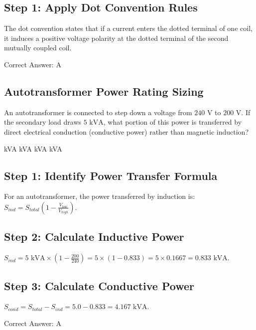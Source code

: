 \begin{solution}

\subsection*{Step 1: Apply Dot Convention Rules}
The dot convention states that if a current enters the dotted terminal of one coil, it induces a positive voltage polarity at the dotted terminal of the second mutually coupled coil.

Correct Answer: A
\end{solution}

\clearpage

\subsection{Autotransformer Power Rating Sizing}

An autotransformer is connected to step down a voltage from $240\text{ V}$ to $200\text{ V}$. If the secondary load draws $5\text{ kVA}$, what portion of this power is transferred by direct electrical conduction (conductive power) rather than magnetic induction?

\begin{choices}
     kVA
     kVA
     kVA
     kVA
\end{choices}

\begin{solution}

\subsection*{Step 1: Identify Power Transfer Formula}
For an autotransformer, the power transferred by induction is: $S_{ind} = S_{total} \left(1 - \frac{V_{low}}{V_{high}}\right)$.

\subsection*{Step 2: Calculate Inductive Power}
$S_{ind} = 5\text{ kVA} \times \left(1 - \frac{200}{240}\right) = 5 \times \left(1 - 0.833\right) = 5 \times 0.1667 = 0.833\text{ kVA}$.

\subsection*{Step 3: Calculate Conductive Power}
$S_{cond} = S_{total} - S_{ind} = 5.0 - 0.833 = 4.167\text{ kVA}$.

Correct Answer: A
\end{solution}

